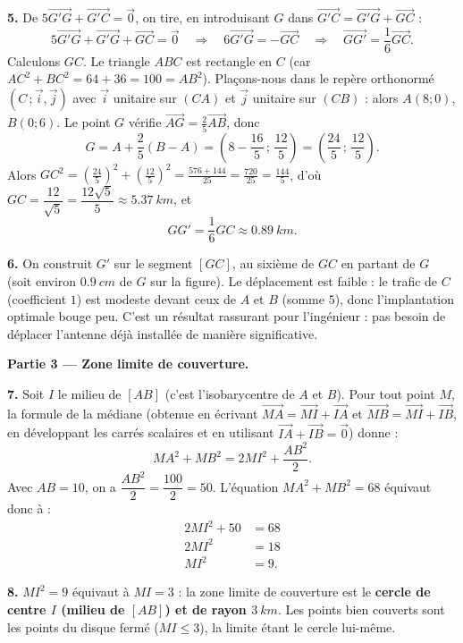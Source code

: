 \documentclass[11pt]{article}
\newcommand{\cle}[1]{{\popxbold\color{popdark}#1}}
\begin{document}
\begin{exoresolu}
\textbf{5.} De $5\overrightarrow{G'G} + \overrightarrow{G'C} = \vec{0}$, on tire, en introduisant $G$ dans $\overrightarrow{G'C} = \overrightarrow{G'G} + \overrightarrow{GC}$ :
\[ 5\overrightarrow{G'G} + \overrightarrow{G'G} + \overrightarrow{GC} = \vec{0} \quad \Longrightarrow \quad 6\overrightarrow{G'G} = -\overrightarrow{GC} \quad \Longrightarrow \quad \overrightarrow{GG'} = \frac{1}{6}\overrightarrow{GC}. \]
Calculons $GC$. Le triangle $ABC$ est rectangle en $C$ (car $AC^2 + BC^2 = 64 + 36 = 100 = AB^2$). Plaçons-nous dans le repère orthonormé $(C\,;\vec{i},\vec{j})$ avec $\vec{i}$ unitaire sur $(CA)$ et $\vec{j}$ unitaire sur $(CB)$ : alors $A(8;0)$, $B(0;6)$. Le point $G$ vérifie $\overrightarrow{AG} = \frac{2}{5}\overrightarrow{AB}$, donc
\[ G = A + \frac{2}{5}(B - A) = \left(8 - \frac{16}{5}\,;\, \frac{12}{5}\right) = \left(\frac{24}{5}\,;\,\frac{12}{5}\right). \]
Alors $GC^2 = \left(\frac{24}{5}\right)^2 + \left(\frac{12}{5}\right)^2 = \frac{576 + 144}{25} = \frac{720}{25} = \frac{144}{5}$, d'où $GC = \dfrac{12}{\sqrt{5}} = \dfrac{12\sqrt{5}}{5} \approx \SI{5,37}{km}$, et
\[ GG' = \frac{1}{6}GC \approx \SI{0,89}{km}. \]

\textbf{6.} On construit $G'$ sur le segment $[GC]$, au sixième de $GC$ en partant de $G$ (soit environ $\SI{0,9}{cm}$ de $G$ sur la figure). Le déplacement est faible : le trafic de $C$ (coefficient $1$) est modeste devant ceux de $A$ et $B$ (somme $5$), donc l'implantation optimale bouge peu. C'est un résultat rassurant pour l'ingénieur : pas besoin de déplacer l'antenne déjà installée de manière significative.

\textbf{Partie 3 — Zone limite de couverture.}

\textbf{7.} Soit $I$ le milieu de $[AB]$ (c'est l'\cle{isobarycentre} de $A$ et $B$). Pour tout point $M$, la formule de la médiane (obtenue en écrivant $\overrightarrow{MA} = \overrightarrow{MI} + \overrightarrow{IA}$ et $\overrightarrow{MB} = \overrightarrow{MI} + \overrightarrow{IB}$, en développant les carrés scalaires et en utilisant $\overrightarrow{IA} + \overrightarrow{IB} = \vec{0}$) donne :
\[ MA^2 + MB^2 = 2MI^2 + \frac{AB^2}{2}. \]
Avec $AB = 10$, on a $\dfrac{AB^2}{2} = \dfrac{100}{2} = 50$. L'équation $MA^2 + MB^2 = 68$ équivaut donc à :
\begin{align*}
2MI^2 + 50 &= 68 \\
2MI^2 &= 18 \\
MI^2 &= 9.
\end{align*}

\textbf{8.} $MI^2 = 9$ équivaut à $MI = 3$ : la zone limite de couverture est le \textbf{cercle de centre $I$ (milieu de $[AB]$) et de rayon $\SI{3}{km}$}. Les points bien couverts sont les points du disque fermé ($MI \leq 3$), la limite étant le cercle lui-même.


\end{exoresolu}
\end{document}
